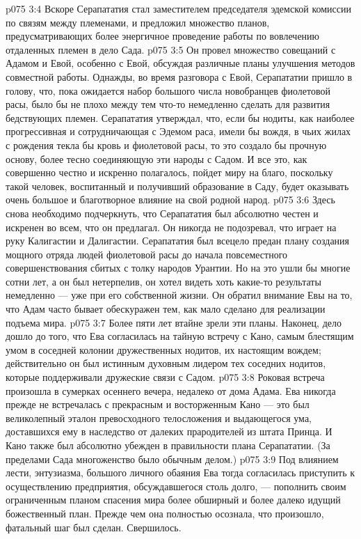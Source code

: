 \vs p075 3:4 \pc Вскоре Серапататия стал заместителем председателя эдемской комиссии по связям между племенами, и предложил множество планов, предусматривающих более энергичное проведение работы по вовлечению отдаленных племен в дело Сада.
\vs p075 3:5 Он провел множество совещаний с Адамом и Евой, особенно с Евой, обсуждая различные планы улучшения методов совместной работы. Однажды, во время разговора с Евой, Серапататии пришло в голову, что, пока ожидается набор большого числа новобранцев фиолетовой расы, было бы не плохо между тем что\hyp{}то немедленно сделать для развития бедствующих племен. Серапататия утверждал, что, если бы нодиты, как наиболее прогрессивная и сотрудничающая с Эдемом раса, имели бы вождя, в чьих жилах с рождения текла бы кровь и фиолетовой расы, то это создало бы прочную основу, более тесно соединяющую эти народы с Садом. И все это, как совершенно честно и искренно полагалось, пойдет миру на благо, поскольку такой человек, воспитанный и получивший образование в Саду, будет оказывать очень большое и благотворное влияние на свой родной народ.
\vs p075 3:6 Здесь снова необходимо подчеркнуть, что Серапататия был абсолютно честен и искренен во всем, что он предлагал. Он никогда не подозревал, что играет на руку Калигастии и Далигастии. Серапататия был всецело предан плану создания мощного отряда людей фиолетовой расы до начала повсеместного совершенствования сбитых с толку народов Урантии. Но на это ушли бы многие сотни лет, а он был нетерпелив, он хотел видеть хоть какие\hyp{}то результаты немедленно --- уже при его собственной жизни. Он обратил внимание Евы на то, что Адам часто бывает обескуражен тем, как мало сделано для реализации подъема мира.
\vs p075 3:7 \pc Более пяти лет втайне зрели эти планы. Наконец, дело дошло до того, что Ева согласилась на тайную встречу с Кано, самым блестящим умом в соседней колонии дружественных нодитов, их настоящим вождем; действительно он был истинным духовным лидером тех соседних нодитов, которые поддерживали дружеские связи с Садом.
\vs p075 3:8 Роковая встреча произошла в сумерках осеннего вечера, недалеко от дома Адама. Ева никогда прежде не встречалась с прекрасным и восторженным Кано --- это был великолепный эталон превосходного телосложения и выдающегося ума, доставшихся ему в наследство от далеких прародителей из штата Принца. И Кано также был абсолютно убежден в правильности плана Серапататии. (За пределами Сада многоженство было обычным делом.)
\vs p075 3:9 Под влиянием лести, энтузиазма, большого личного обаяния Ева тогда согласилась приступить к осуществлению предприятия, обсуждавшегося столь долго, --- пополнить своим ограниченным планом спасения мира более обширный и более далеко идущий божественный план. Прежде чем она полностью осознала, что произошло, фатальный шаг был сделан. Свершилось.
